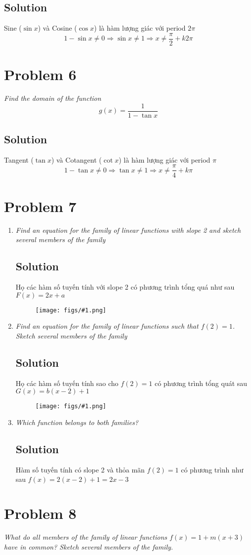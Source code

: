\documentclass[11pt]{article}
\newcommand{\soln}{\subsection*}
\newcommand{\qn}{\textit}
\newcommand{\imgsoln}[1]{
	\begin{figure}[H]
		\centering
		\texttt{[image: figs/\#1.png]}
	\end{figure}
}
\begin{document}
\soln{Solution}
Sine ($\sin{x}$) và Cosine ($\cos{x}$) là hàm lượng giác với period $2\pi$
\begin{equation*}
	1-\sin{x} \ne 0 \Rightarrow \sin{x} \ne 1 \Rightarrow x \ne \frac{\pi}{2} + k2\pi
\end{equation*}

\section*{Problem 6}

\qn{Find the domain of the function $$g(x)=\frac{1}{1-\tan{x}}$$}

\soln{Solution}
Tangent ($\tan{x}$) và Cotangent ($\cot{x}$) là hàm lượng giác với period $\pi$
\begin{equation*}
	1-\tan{x} \ne 0 \Rightarrow \tan{x} \ne 1 \Rightarrow x \ne \frac{\pi}{4} + k\pi
\end{equation*}

\section*{Problem 7}

\begin{enumerate}
	\item \qn{Find an equation for the family of linear functions with slope 2 and sketch several members of the family}
	\soln{Solution}
	Họ các hàm số tuyến tính với slope 2 có phương trình tổng quá như sau $F(x)=2x+a$
	\imgsoln{1.2.7-ans.a}
	
	\item \qn{Find an equation for the family of linear functions such that $f(2)=1$. Sketch several members of the family}
	\soln{Solution}
	Họ các hàm số tuyến tính sao cho $f(2)=1$ có phương trình tổng quát sau $G(x)=b(x-2)+1$
	\imgsoln{1.2.7-ans.b}
	
	\item \qn{Which function belongs to both families?}
	\soln{Solution}
	Hàm số tuyến tính có slope 2 và thỏa mãn $f(2)=1$ có phương trình như sau $f(x)=2(x-2)+1=2x-3$
\end{enumerate}

\section*{Problem 8}

\qn{What do all members of the family of linear functions $f(x)=1+m(x+3)$ have in common? Sketch several members of the family.}
\end{document}
